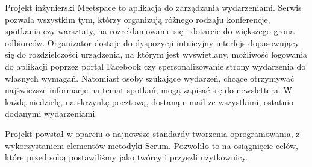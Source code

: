 Projekt inżynierski Meetspace to aplikacja do zarządzania wydarzeniami. Serwis pozwala wszystkim tym, którzy organizują różnego rodzaju konferencje, spotkania czy warsztaty, na rozreklamowanie się i dotarcie do większego grona odbiorców. Organizator dostaje do dyspozycji intuicyjny interfejs dopasowujący się do rozdzielczości urządzenia, na którym jest wyświetlany, możliwość logowania do aplikacji poprzez portal Facebook czy spersonalizowanie strony wydarzenia do własnych wymagań. Natomiast osoby szukające wydarzeń, chcące otrzymywać najświeższe informacje na temat spotkań, mogą zapisać się do newslettera. W każdą niedzielę, na skrzynkę pocztową, dostaną e-mail ze wszystkimi, ostatnio dodanymi wydarzeniami.

Projekt powstał w oparciu o najnowsze standardy tworzenia oprogramowania, z wykorzystaniem elementów metodyki Scrum. Pozwoliło to na osiągnięcie celów, które przed sobą postawiliśmy jako twórcy i przyszli użytkownicy.
